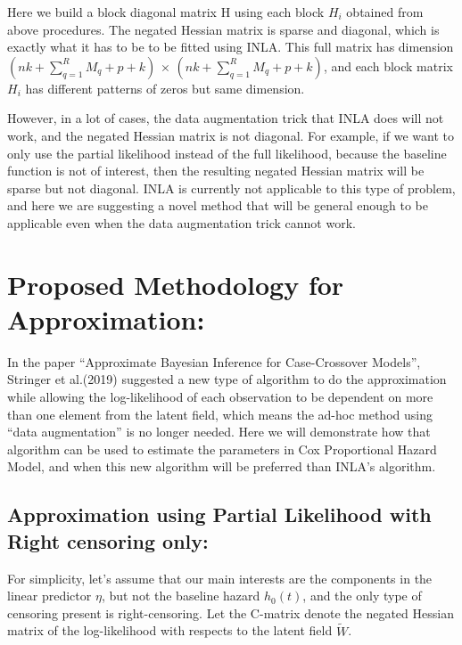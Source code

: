 \documentclass[]{article}
\begin{document}
Here we build a block diagonal matrix H using each block \(H_i\)
obtained from above procedures. The negated Hessian matrix is sparse and
diagonal, which is exactly what it has to be to be fitted using INLA.
This full matrix has dimension \((nk+\sum_{q=1}^{R}M_q + p +k)\)
\(\times\) \((nk+\sum_{q=1}^{R}M_q + p +k)\), and each block matrix
\(H_{i}\) has different patterns of zeros but same dimension.

However, in a lot of cases, the data augmentation trick that INLA does
will not work, and the negated Hessian matrix is not diagonal. For
example, if we want to only use the partial likelihood instead of the
full likelihood, because the baseline function is not of interest, then
the resulting negated Hessian matrix will be sparse but not diagonal.
INLA is currently not applicable to this type of problem, and here we
are suggesting a novel method that will be general enough to be
applicable even when the data augmentation trick cannot work.

\hypertarget{proposed-methodology-for-approximation}{%
\section{Proposed Methodology for
Approximation:}\label{proposed-methodology-for-approximation}}

In the paper ``Approximate Bayesian Inference for Case-Crossover
Models'', Stringer et al.(2019) suggested a new type of algorithm to do
the approximation while allowing the log-likelihood of each observation
to be dependent on more than one element from the latent field, which
means the ad-hoc method using ``data augmentation'' is no longer needed.
Here we will demonstrate how that algorithm can be used to estimate the
parameters in Cox Proportional Hazard Model, and when this new algorithm
will be preferred than INLA's algorithm.

\hypertarget{approximation-using-partial-likelihood-with-right-censoring-only}{%
\subsection{Approximation using Partial Likelihood with Right censoring
only:}\label{approximation-using-partial-likelihood-with-right-censoring-only}}

For simplicity, let's assume that our main interests are the components
in the linear predictor \(\eta\), but not the baseline hazard
\(h_0(t)\), and the only type of censoring present is right-censoring.
Let the C-matrix denote the negated Hessian matrix of the log-likelihood
with respects to the latent field \(\tilde{W}\).
\end{document}
